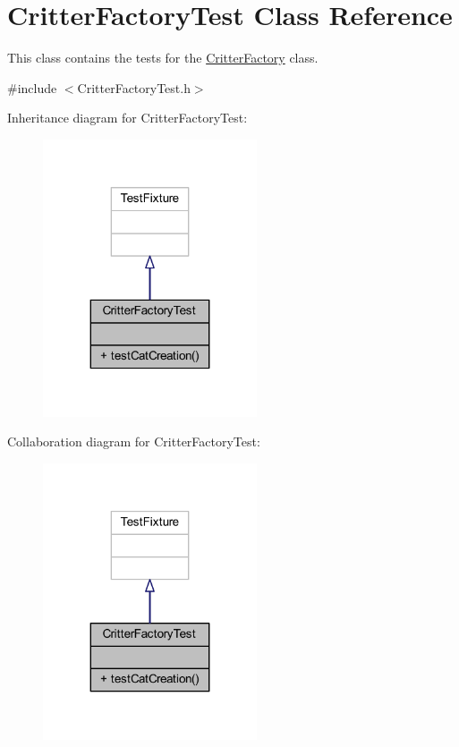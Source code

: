 \hypertarget{class_critter_factory_test}{\section{Critter\+Factory\+Test Class Reference}
\label{class_critter_factory_test}
}


This class contains the tests for the \hyperlink{class_critter_factory}{Critter\+Factory} class.  




{\ttfamily \#include $<$Critter\+Factory\+Test.\+h$>$}



Inheritance diagram for Critter\+Factory\+Test\+:\nopagebreak
\begin{figure}[H]
\begin{center}
\leavevmode
\includegraphics[width=179pt]{class_critter_factory_test__inherit__graph}
\end{center}
\end{figure}


Collaboration diagram for Critter\+Factory\+Test\+:\nopagebreak
\begin{figure}[H]
\begin{center}
\leavevmode
\includegraphics[width=179pt]{class_critter_factory_test__coll__graph}
\end{center}
\end{figure}
